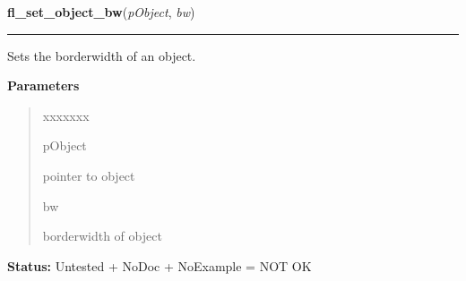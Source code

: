 \hspace{.8\funcindent}\begin{boxedminipage}{\funcwidth}

    \raggedright \textbf{fl\_set\_object\_bw}(\textit{pObject}, \textit{bw})

    \vspace{-1.5ex}

    \rule{\textwidth}{0.5\fboxrule}
\setlength{\parskip}{2ex}
    Sets the borderwidth of an object.

\setlength{\parskip}{1ex}
      \textbf{Parameters}
      \vspace{-1ex}

      \begin{quote}
        \begin{Ventry}{xxxxxxx}

          \item[pObject]

          pointer to object

          \item[bw]

          borderwidth of object

        \end{Ventry}

      \end{quote}

\textbf{Status:} Untested + NoDoc + NoExample = NOT OK



    \end{boxedminipage}

    \label{xformslib:library:fl_get_object_bw}

    \vspace{0.5ex}


